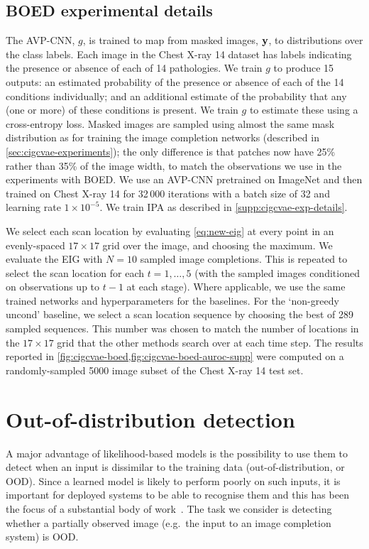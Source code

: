 \subsection{BOED experimental details}
The AVP-CNN, $g$, is trained to map from masked images, ${\mathbf{y}}$, to
distributions over the class labels. Each image in the Chest X-ray 14 dataset
has labels indicating the presence or absence of each of 14 pathologies. We
train $g$ to produce 15 outputs: an estimated probability of the presence or
absence of each of the 14 conditions individually; and an additional estimate of
the probability that any (one or more) of these conditions is present. We train
$g$ to estimate these using a cross-entropy loss. Masked images are sampled
using almost the same mask distribution as for training the image completion
networks (described in \cref{sec:cigcvae-experiments}); the only difference is that
patches now have 25\% rather than 35\% of the image width, to match the
observations we use in the experiments with BOED. We use an AVP-CNN pretrained
on ImageNet and then trained on Chest X-ray 14 for 32\,000 iterations with a
batch size of 32 and learning rate $1\times10^{-5}$. We train IPA as described
in \cref{supp:cigcvae-exp-details}.

We select each scan location by evaluating \cref{eq:new-eig} at every point in
an evenly-spaced $17\times17$ grid over the image, and choosing the maximum. We
evaluate the EIG with $N=10$ sampled image completions. This is repeated to
select the scan location for each $t=1,\ldots,5$ (with the sampled images
conditioned on observations up to $t-1$ at each stage). Where applicable, we use
the same trained networks and hyperparameters for the baselines. For the
`non-greedy uncond' baseline, we select a scan location sequence by choosing the
best of 289 sampled sequences. This number was chosen to match the number of
locations in the $17\times17$ grid that the other methods search over at each
time step. The results reported in \cref{fig:cigcvae-boed,fig:cigcvae-boed-auroc-supp} were
computed on a randomly-sampled 5000 image subset of the Chest X-ray 14 test set.


\section{Out-of-distribution detection} \label{supp:cigcvae-ood} A major advantage of
likelihood-based models is the possibility to use them to detect when an input
is dissimilar to the training data (out-of-distribution, or OOD). Since a
learned model is likely to perform poorly on such inputs, it is important for
deployed systems to be able to recognise them and this has been the focus of a
substantial body of
work~\citep{ren2019likelihood,hendrycks2016baseline,xiao2020likelihood,havtorn2021hierarchical}.
The task we consider is detecting whether a partially observed image (e.g.~the
input to an image completion system) is OOD.



